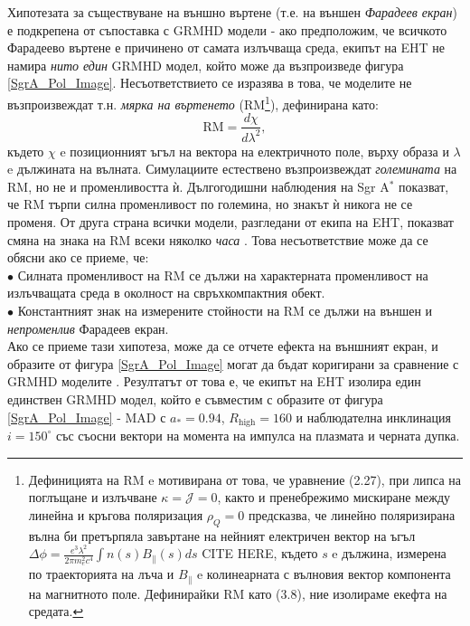 Хипотезата за съществуване на външно въртене (т.е. на външен \emph{Фарадеев екран}) е подкрепена от съпоставка с GRMHD модели - ако предположим, че всичкото Фарадеево въртене е причинено от самата излъчваща среда, екипът на EHT не намира \emph{нито един} GRMHD модел, който може да възпроизведе фигура \ref{SgrA_Pol_Image}. Несъответствието се изразява в това, че моделите не възпроизвеждат т.н. \emph{мярка на въртенето} (RM\footnote{
	Дефиницията на RM e мотивирана от това, че уравнение (2.27), при липса на поглъщане и излъчване $\kappa = \mathcal{J} = 0$, както и пренебрежимо мискиране между линейна и кръгова поляризация $\rho_Q = 0$ предсказва, че линейно поляризирана вълна би претърпяла завъртане на нейният електричен вектор на ъгъл $\Delta\phi = \frac{e^3\lambda^2}{2\pi m_e^2 c^4}\int n(s)B_\parallel(s) ds$ CITE HERE, където $s$ e дължина, измерена по траекторията на лъча и $B_\parallel$ e колинеарната с вълновия вектор компонента на магнитното поле. Дефинирайки RM като (3.8), ние изолираме екефта на средата.
	}), дефинирана като:
\begin{equation}
	\text{RM} = \frac{d\chi}{d\lambda^2},
\end{equation}
където $\chi$ e позиционният ъгъл на вектора на електричното поле, върху образа и $\lambda$ e дължината на вълната. Симулациите естествено възпроизвеждат \emph{големината} на RM, но не и променливостта ѝ. Дългогодишни наблюдения на Sgr A$^*$ показват, че RM търпи силна променливост по големина, но знакът ѝ никога не се променя. От друга страна всички модели, разгледани от екипа на EHT, показват смяна на знака на RM всеки няколко \emph{часа} \cite{EHT_SGR_VIII}. Това несъответствие може да се обясни ако се приеме, че:\\\newline
$\bullet$ Силната променливост на RM се дължи на характерната променливост на излъчващата среда в околност на свръхкомпактния обект.\\\newline
$\bullet$ Константният знак на измерените стойности на RM се дължи на външен и \emph{непроменлив} Фарадеев екран.\\

Ако се приеме тази хипотеза, може да се отчете ефекта на външният екран, и образите от фигура \ref{SgrA_Pol_Image} могат да бъдат коригирани за сравнение с GRMHD моделите \cite{EHT_SGR_VIII}. Резултатът от това е, че екипът на EHT изолира един единствен GRMHD модел, който е съвместим с образите от фигура \ref{SgrA_Pol_Image} - MAD с $a_* = 0.94$, $R_\text{high} = 160$ и наблюдателна инклинация $i = 150^\circ$ със съосни вектори на момента на импулса на плазмата и черната дупка.